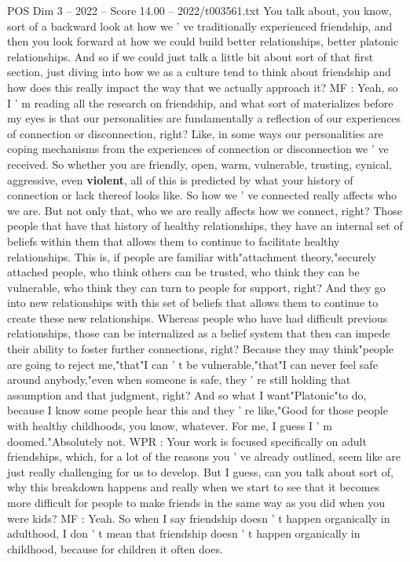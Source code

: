 \begin{textsample}{POS Dim 3 – 2022 – Score 14.00 – 2022/t003561.txt}
You talk about, you know, sort of a backward look at how we ' ve traditionally experienced friendship, and then you look forward at how we could build better relationships, better platonic relationships.
And so if we could just talk a little bit about sort of that first section, just diving into how we as a culture tend to think about friendship and how does this really impact the way that we actually approach it?
MF : Yeah, so I ' m reading all the research on friendship, and what sort of materializes before my eyes is that our personalities are fundamentally a reflection of our experiences of connection or disconnection, right?
Like, in some ways our personalities are coping mechanisms from the experiences of connection or disconnection we ' ve received.
So whether you are friendly, open, warm, vulnerable, trusting, cynical, aggressive, even \textbf{violent}, all of this is predicted by what your history of connection or lack thereof looks like.
So how we ' ve connected really affects who we are.
But not only that, who we are really affects how we connect, right?
Those people that have that history of healthy relationships, they have an internal set of beliefs within them that allows them to continue to facilitate healthy relationships.
This is, if people are familiar with"attachment theory,"securely attached people, who think others can be trusted, who think they can be vulnerable, who think they can turn to people for support, right?
And they go into new relationships with this set of beliefs that allows them to continue to create these new relationships.
Whereas people who have had difficult previous relationships, those can be internalized as a belief system that then can impede their ability to foster further connections, right?
Because they may think"people are going to reject me,"that"I can ' t be vulnerable,"that"I can never feel safe around anybody,"even when someone is safe, they ' re still holding that assumption and that judgment, right?
And so what I want"Platonic"to do, because I know some people hear this and they ' re like,"Good for those people with healthy childhoods, you know, whatever.
For me, I guess I ' m doomed."Absolutely not.
WPR : Your work is focused specifically on adult friendships, which, for a lot of the reasons you ' ve already outlined, seem like are just really challenging for us to develop.
But I guess, can you talk about sort of, why this breakdown happens and really when we start to see that it becomes more difficult for people to make friends in the same way as you did when you were kids?
MF : Yeah.
So when I say friendship doesn ' t happen organically in adulthood, I don ' t mean that friendship doesn ' t happen organically in childhood, because for children it often does.

\end{textsample}
